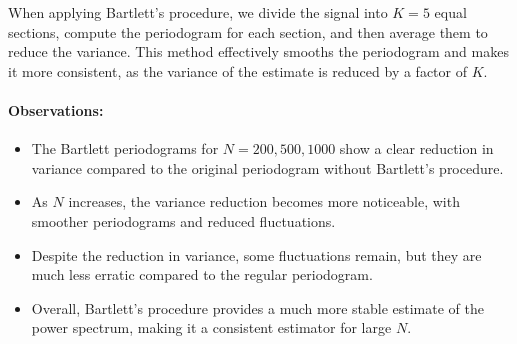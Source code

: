 \documentclass[11pt]{article}
\begin{document}
\begin{solution}


    When applying Bartlett's procedure, we divide the signal into \( K = 5 \) equal sections, compute the periodogram for each section, and then average them to reduce the variance. This method effectively smooths the periodogram and makes it more consistent, as the variance of the estimate is reduced by a factor of \( K \).

    \paragraph{Observations:}
    \begin{itemize}
        \item The Bartlett periodograms for \(N = 200, 500, 1000\) show a clear reduction in variance compared to the original periodogram without Bartlett's procedure. 
        \item As \(N\) increases, the variance reduction becomes more noticeable, with smoother periodograms and reduced fluctuations.
        \item Despite the reduction in variance, some fluctuations remain, but they are much less erratic compared to the regular periodogram.
        \item Overall, Bartlett’s procedure provides a much more stable estimate of the power spectrum, making it a consistent estimator for large \(N\).
    \end{itemize}
    

\end{solution}
\end{document}
